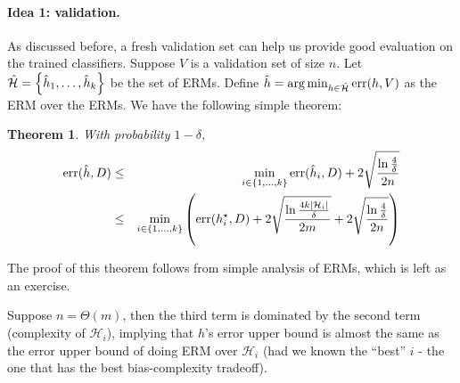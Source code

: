 \documentclass{article}
\newtheorem{theorem}{Theorem}
\DeclareMathOperator*{\err}{{\rm err}}
\newcommand{\Hcal}{\mathcal{H}}
\begin{document}



\paragraph{Idea 1: validation.} As discussed before, a fresh validation set can help us provide good evaluation on the trained classifiers. Suppose $V$ is a validation set of size $n$. Let $\hat{\Hcal} = \cbr{\hat{h}_1, \ldots, \hat{h}_k}$ be the set of ERMs.
Define $\hat{h} = \arg\min_{h \in \hat{\Hcal}} \err(h, V)$ as the ERM over the ERMs. We have the following simple theorem:
\begin{theorem}
  With probability $1-\delta$,
  \begin{eqnarray*}
    \err(\hat{h}, D) &\leq& \min_{i \in \cbr{1,\ldots,k}} \err(\hat{h}_i, D) + 2\sqrt{\frac{\ln\frac{4}{\delta}}{2n}} \\
    &\leq& \min_{i \in \cbr{1,\ldots,k}} \del{\err(h_i^\star, D) + 2\sqrt{\frac{\ln\frac{4k|\Hcal_i|}{\delta}}{2m}}
    + 2\sqrt{\frac{\ln\frac{4}{\delta}}{2n}}}
  \end{eqnarray*}
\end{theorem}

The proof of this theorem follows from simple analysis of ERMs, which is left as an exercise.

Suppose $n = \Theta(m)$, then the third term is dominated by the second term (complexity of $\Hcal_i$), implying that $\hat{h}$'s error upper bound is almost the same as the error upper bound of doing ERM over $\Hcal_i$ (had we known the ``best'' $i$ - the one that has the best bias-complexity tradeoff).
\end{document}
